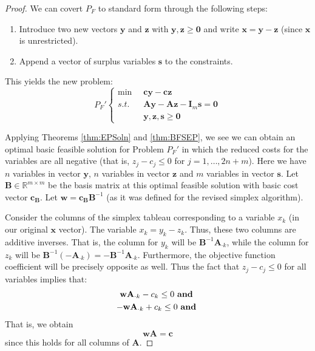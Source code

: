 \begin{proof}
We can covert $P_F$ to standard form through the following steps: 
\begin{enumerate}
\item Introduce two new vectors $\mathbf{y}$ and $\mathbf{z}$ with $\mathbf{y},\mathbf{z} \geq \mathbf{0}$ and write $\mathbf{x} = \mathbf{y} - \mathbf{z}$ (since $\mathbf{x}$ is unrestricted).
\item Append a vector of surplus variables $\mathbf{s}$ to the constraints. 
\end{enumerate}
This yields the new problem:
\begin{equation}
P_F'\left\{
\begin{aligned}
\min\;\; & \mathbf{cy}-\mathbf{cz}\\
s.t.\;\; & \mathbf{Ay} - \mathbf{A}\mathbf{z} - \mathbf{I}_m\mathbf{s} = \mathbf{0}\\
& \mathbf{y}, \mathbf{z}, \mathbf{s} \geq \mathbf{0}
\end{aligned}\right.
\end{equation} 

Applying Theorems \ref{thm:EPSoln} and \ref{thm:BFSEP}, we see we can obtain an optimal basic feasible solution for Problem $P_F'$ in which the reduced costs for the variables are all negative (that is, $z_j - c_j \leq 0$ for $j=1,\dots,2n+m$). Here we have $n$ variables in vector $\mathbf{y}$, $n$ variables in vector $\mathbf{z}$ and $m$ variables in vector $\mathbf{s}$. Let $\mathbf{B} \in \mathbb{R}^{m \times m}$ be the basis matrix at this optimal feasible solution with basic cost vector $\mathbf{c}_\mathbf{B}$. Let $\mathbf{w} = \mathbf{c}_\mathbf{B}\mathbf{B}^{-1}$ (as it was defined for the revised simplex algorithm). 

Consider the columns of the simplex tableau corresponding to a variable $x_k$ (in our original $\mathbf{x}$ vector). The variable $x_k = y_k - z_k$. Thus, these two columns are additive inverses. That is, the column for $y_k$ will be $\mathbf{B}^{-1} \mathbf{A}_{\cdot k}$, while the column for $z_k$ will be $\mathbf{B}^{-1} (-\mathbf{A}_{\cdot k}) = -\mathbf{B}^{-1} \mathbf{A}_{\cdot k}$. Furthermore, the objective function coefficient will be precisely opposite as well. Thus the fact that $z_j - c_j \leq 0$ for all variables implies that:
\begin{gather*}
\mathbf{w}\mathbf{A}_{\cdot k} - c_k \leq 0 \text{ \textbf{and} }\\
-\mathbf{w}\mathbf{A}_{\cdot k} + c_k \leq 0 \text{ \textbf{and} }\\
\end{gather*}
That is, we obtain
\begin{equation}
\mathbf{w}\mathbf{A} = \mathbf{c}
\end{equation}
since this holds for all columns of $\mathbf{A}$. 


\end{proof}
